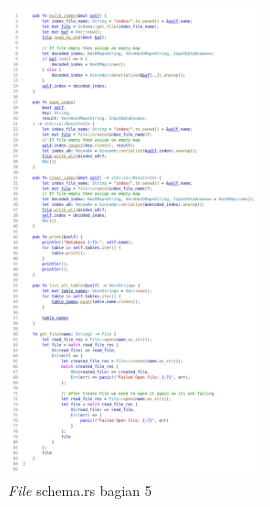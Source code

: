 \begin{figure}[H]
  \centering{}
	\includegraphics[width=0.6\textwidth]{gambar/lampiran/file-schema-5.png}
  \caption{\emph{File} schema.rs bagian 5}
\end{figure}

